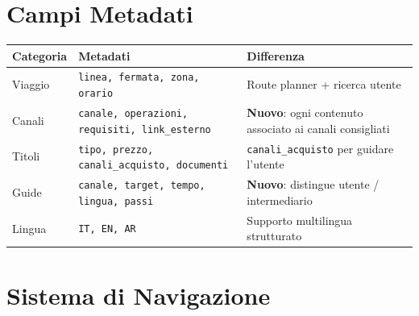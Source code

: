 ﻿\documentclass[11pt,a4paper]{article}
\begin{document}
\section{Campi Metadati}

\begin{tcolorbox}[rffield]
\small
\renewcommand{\arraystretch}{1.1}
\begin{tabular}{|p{2.5cm}|p{5.5cm}|p{5cm}|}
\hline
\textbf{Categoria} & \textbf{Metadati} & \textbf{Differenza} \\
\hline
Viaggio & \texttt{linea, fermata, zona, orario} & Route planner + ricerca utente \\
\hline
Canali & \texttt{canale, operazioni, requisiti, link\_esterno} & \textbf{Nuovo}: ogni contenuto associato ai canali consigliati \\
\hline
Titoli & \texttt{tipo, prezzo, canali\_acquisto, documenti} & \texttt{canali\_acquisto} per guidare l'utente \\
\hline
Guide & \texttt{canale, target, tempo, lingua, passi} & \textbf{Nuovo}: distingue utente / intermediario \\
\hline
Lingua & \texttt{IT, EN, AR} & Supporto multilingua strutturato \\
\hline
\end{tabular}
\end{tcolorbox}

\section{Sistema di Navigazione}
\end{document}
